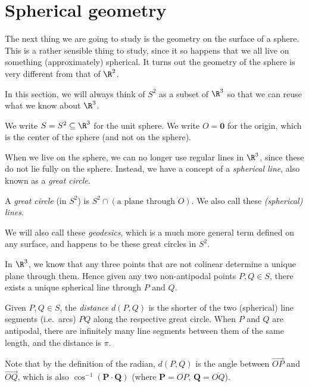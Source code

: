 \documentclass[a4paper]{article}
\begin{document}
\section{Spherical geometry}
The next thing we are going to study is the geometry on the surface of a sphere. This is a rather sensible thing to study, since it so happens that we all live on something (approximately) spherical. It turns out the geometry of the sphere is very different from that of $\R^2$.

In this section, we will always think of $S^2$ as a subset of $\R^3$ so that we can reuse what we know about $\R^3$.
\begin{notation}
  We write $S = S^2 \subseteq \R^3$ for the unit sphere. We write $O = \mathbf{0}$ for the origin, which is the center of the sphere (and not on the sphere).
\end{notation}

When we live on the sphere, we can no longer use regular lines in $\R^3$, since these do not lie fully on the sphere. Instead, we have a concept of a \emph{spherical line}, also known as a \emph{great circle}.
\begin{defi}
  A \emph{great circle} (in $S^2$) is $S^2 \cap (\text{a plane through }O)$. We also call these \emph{(spherical) lines}.
\end{defi}
We will also call these \emph{geodesics}, which is a much more general term defined on any surface, and happens to be these great circles in $S^2$.

In $\R^3$, we know that any three points that are not colinear determine a unique plane through them. Hence given any two non-antipodal points $P, Q \in S$, there exists a unique spherical line through $P$ and $Q$.

\begin{defi}
  Given $P, Q \in S$, the \emph{distance} $d(P, Q)$ is the shorter of the two (spherical) line segments (i.e.\ arcs) $PQ$ along the respective great circle. When $P$ and $Q$ are antipodal, there are infinitely many line segments between them of the same length, and the distance is $\pi$.
\end{defi}
Note that by the definition of the radian, $d(P, Q)$ is the angle between $\overrightarrow{OP}$ and $\overrightarrow{OQ}$, which is also $\cos^{-1}(\mathbf{P}\cdot \mathbf{Q})$ (where $\mathbf{P} = \overline{OP}$, $\mathbf{Q} = \overline{OQ}$).
\end{document}
